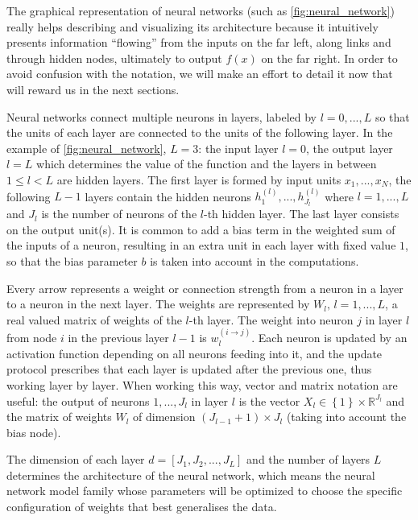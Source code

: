 The graphical representation of neural networks (such as \autoref{fig:neural_network}) really helps describing and visualizing its architecture because it intuitively presents information ``flowing'' from the inputs on the far left, along links and through hidden nodes, ultimately to output $f(x)$ on the far right. In order to avoid confusion with the notation, we will make an effort to detail it now that will reward us in the next sections.

Neural networks connect multiple neurons in layers, labeled by $l=0,...,L$ so that the units of each layer are connected to the units of the following layer. In the example of \autoref{fig:neural_network}, $L=3$: the input layer $l=0$, the output layer $l=L$ which determines the value of the function and the layers in between $1 \leq l<L$ are hidden layers. The first layer is formed by input units $x_1,...,x_N$, the following $L-1$ layers contain the hidden neurons $h_{1}^{(l)},...,h_{J_{l}}^{(l)}$ where $l=1,...,L$ and $J_{l}$ is the number of neurons of the $l$-th hidden layer. The last layer consists on the output unit(s). It is common to add a bias term in the weighted sum of the inputs of a neuron, resulting in an extra unit in each layer with fixed value $1$, so that the bias parameter $b$ is taken into account in the computations.

Every arrow represents a weight or connection strength from a neuron in a layer to a neuron in the next layer. The weights are represented by $W_l, \, l=1,...,L$, a real valued matrix of weights of the $l$-th layer. The weight into neuron $j$ in layer $l$ from node $i$ in the previous layer $l-1$ is $w_{l}^{(i \rightarrow j)}$. Each neuron is updated by an activation function depending on all neurons feeding into it, and the update protocol prescribes that each layer is updated after the previous one, thus working layer by layer. When working this way, vector and matrix notation are useful: the output of neurons $1,...,J_l$ in layer $l$ is the vector $X_l \in \left\lbrace 1 \right\rbrace \times \mathbb{R}^{J_l}$ and the matrix of weights $W_l$ of dimension $(J_{l-1}+1) \times J_l$ (taking into account the bias node).

The dimension of each layer $d = [J_{1}, J_{2},..., J_{L}]$ and the number of layers $L$ determines the architecture of the neural network, which means the neural network model family whose parameters will be optimized to choose the specific configuration of weights that best generalises the data.

